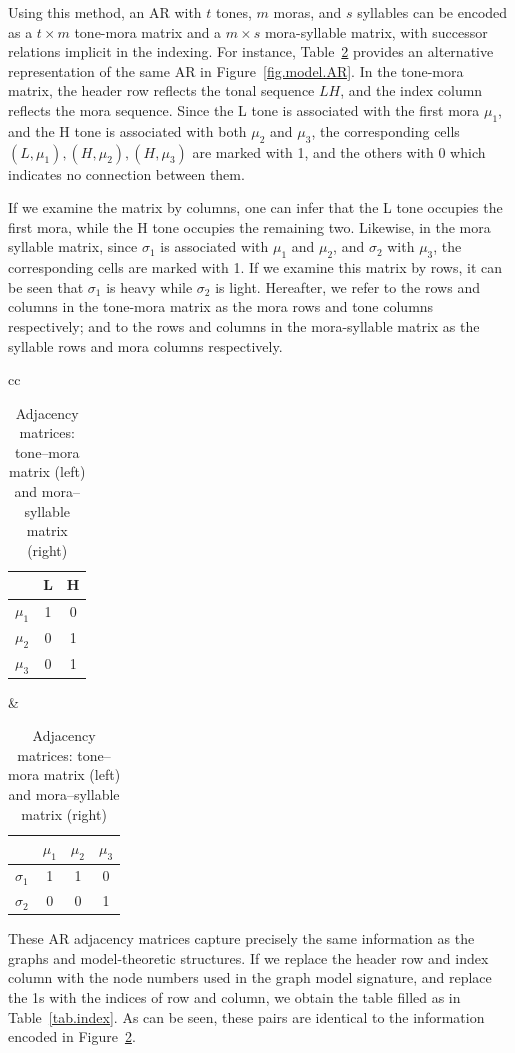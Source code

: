Using this method, an AR with $t$ tones, $m$ moras, and $s$ 
syllables can be encoded as a $t \times m$ tone-mora matrix and 
a $m \times s$ mora-syllable matrix, with successor relations 
implicit in the indexing. For instance, Table~\ref{tab.matrices} provides an alternative
representation of the same AR in Figure~\ref{fig.model.AR}.
In the tone-mora matrix, the header row reflects the tonal sequence
$LH$, and the index column reflects the mora sequence. Since the L tone is
associated with the first mora $\mu_1$, and the H tone is associated with
both $\mu_2$ and $\mu_3$, the corresponding cells
$(L, \mu_1), (H, \mu_2), (H, \mu_3)$ are marked with 1, and the others
with 0 which indicates no connection between them.

If we examine the matrix by columns, one can infer that
the L tone occupies the first mora, while the H tone occupies the
remaining two.  Likewise, in the mora syllable matrix, since
$\sigma_1$ is associated with $\mu_1$ and $\mu_2$, and $\sigma_2$ with
$\mu_3$, the corresponding cells are marked with 1. If we examine this
matrix by rows, it can be seen that $\sigma_1$ is heavy while
$\sigma_2$ is light. Hereafter, we refer to the rows and columns in
the tone-mora matrix as the mora rows and tone columns respectively;
and to the rows and columns in the mora-syllable matrix as the
syllable rows and mora columns respectively.
\begin{table}[ht]
\centering 
	\begin{tabular}{cc}
	\centering
	\begin{tabular}{c|cc}
			& L & H \\
			\hline
			$\mu_1$ & 1 & 0 \\
			$\mu_2$ & 0 & 1 \\
			$\mu_3$ & 0 & 1 \\
	\end{tabular} \vspace{1em}
		&
	\begin{tabular}{c|ccc}
			& $\mu_1$ & $\mu_2$ & $\mu_3$ \\ \hline
			$\sigma_1$ & 1     & 1     & 0     \\
			$\sigma_2$ & 0     & 0     & 1
	\end{tabular}
	\end{tabular}
	\caption{Adjacency matrices: tone–mora matrix (left) and mora–syllable matrix (right)}
	
	\label{tab.matrices}
\end{table}

These AR adjacency matrices capture precisely the same information as
the graphs and model-theoretic structures. If we replace the header
row and index column with the node numbers used in the graph model
signature, and replace the 1s with the indices of row and column, we
obtain the table filled as in Table~\ref{tab.index}. As can be
seen, these pairs are identical to the information encoded in
Figure~\ref{tab.matrices}.

